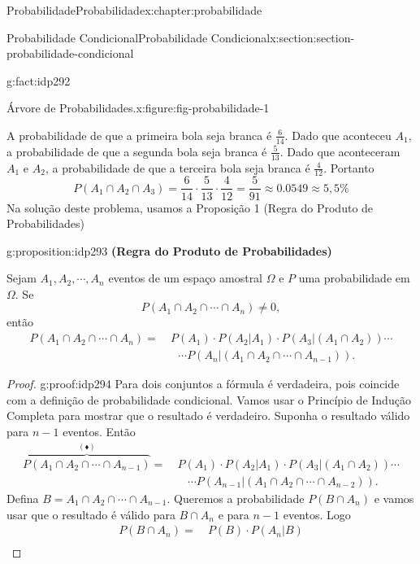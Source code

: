 \documentclass[oneside,10pt,]{book}
\newcommand{\terminology}[1]{\textbf{#1}}
\numberwithin{equation}{section}
\newcommand{\amp}{&}
\begin{document}
\begin{chapterptx}{Probabilidade}{}{Probabilidade}{}{}{x:chapter:probabilidade}
\begin{sectionptx}{Probabilidade Condicional}{}{Probabilidade Condicional}{}{}{x:section:section-probabilidade-condicional}
\begin{fact}{}{}{g:fact:idp292}
\begin{figureptx}{Árvore de Probabilidades.}{x:figure:fig-probabilidade-1}{}
\begin{image}{0.1}{0.8}{0.1}
\end{image}%
\tcblower
\end{figureptx}%
A probabilidade de que a primeira bola seja branca é \(\frac{6}{14}\). Dado que aconteceu \(A_1\), a probabilidade de que a segunda bola seja branca é \(\frac{5}{13}\). Dado que aconteceram \(A_1\) e \(A_2\), a probabilidade de que a terceira bola seja branca é \(\frac{4}{12}\). Portanto%
\begin{equation*}
P(A_1\cap A_2\cap A_3) = \frac{6}{14}\cdot\frac{5}{13}\cdot\frac{4}{12} = \frac{5}{91} \approx 0.0549 \approx 5,5\% 
\end{equation*}
Na solução deste problema, usamos a Proposição 1 (Regra do Produto de Probabilidades)%
\end{fact}
\begin{proposition}{}{}{g:proposition:idp293}%
\terminology{(Regra do Produto de Probabilidades)}%
\par
Sejam \(A_1, A_2, \cdots, A_n\) eventos de um espaço amostral \(\Omega\) e \(P\) uma probabilidade em \(\Omega\). Se%
\begin{equation*}
P(A_1\cap A_2\cap \cdots \cap A_n) \neq 0, 
\end{equation*}
então%
\begin{align*}
P(A_1\cap A_2\cap \cdots \cap A_n) = \amp ~ P(A_1)\cdot P(A_2|A_1)\cdot P(A_3|(A_1\cap A_2))\cdots \\
\amp ~~~~ \cdots P(A_n|(A_1\cap A_2\cap \cdots \cap A_{n-1})). 
\end{align*}
%
\end{proposition}
\begin{proof}{}{g:proof:idp294}
Para dois conjuntos a fórmula é verdadeira, pois coincide com a definição de probabilidade condicional. Vamos usar o Princípio de Indução Completa para mostrar que o resultado é verdadeiro. Suponha o resultado válido para \(n-1\) eventos. Então%
\begin{align*}
\overbrace{P(A_1\cap A_2\cap \cdots \cap A_{n-1})}^{(\blacklozenge)} = \amp ~  P(A_1)\cdot P(A_2|A_1)\cdot P(A_3|(A_1\cap A_2))\cdots \\
\amp ~~~~ ~ \cdots P(A_{n-1}|(A_1\cap A_2\cap \cdots \cap A_{n-2})). 
\end{align*}
Defina \(B = A_1\cap A_2\cap \cdots \cap A_{n-1}\). Queremos a probabilidade \(P(B\cap A_n)\) e vamos usar que o resultado é válido para \(B\cap A_n\) e para \(n-1\) eventos. Logo%
\begin{align*}
P(B\cap A_n) = \amp ~  P(B)\cdot P(A_n|B) \\

\end{align*}
\end{proof}
\end{sectionptx}
\end{chapterptx}
\end{document}
